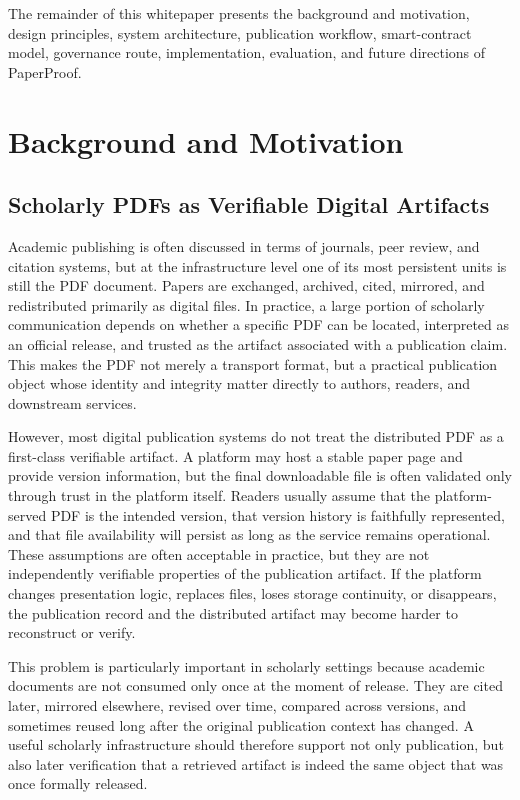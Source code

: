 \documentclass[journal]{IEEEtran}
\begin{document}
The remainder of this whitepaper presents the background and motivation, design principles, system architecture, publication workflow, smart-contract model, governance route, implementation, evaluation, and future directions of PaperProof.


\section{Background and Motivation}

\subsection{Scholarly PDFs as Verifiable Digital Artifacts}

Academic publishing is often discussed in terms of journals, peer review, and citation systems, but at the infrastructure level one of its most persistent units is still the PDF document. Papers are exchanged, archived, cited, mirrored, and redistributed primarily as digital files. In practice, a large portion of scholarly communication depends on whether a specific PDF can be located, interpreted as an official release, and trusted as the artifact associated with a publication claim. This makes the PDF not merely a transport format, but a practical publication object whose identity and integrity matter directly to authors, readers, and downstream services.

However, most digital publication systems do not treat the distributed PDF as a first-class verifiable artifact. A platform may host a stable paper page and provide version information, but the final downloadable file is often validated only through trust in the platform itself. Readers usually assume that the platform-served PDF is the intended version, that version history is faithfully represented, and that file availability will persist as long as the service remains operational. These assumptions are often acceptable in practice, but they are not independently verifiable properties of the publication artifact. If the platform changes presentation logic, replaces files, loses storage continuity, or disappears, the publication record and the distributed artifact may become harder to reconstruct or verify.

This problem is particularly important in scholarly settings because academic documents are not consumed only once at the moment of release. They are cited later, mirrored elsewhere, revised over time, compared across versions, and sometimes reused long after the original publication context has changed. A useful scholarly infrastructure should therefore support not only publication, but also later verification that a retrieved artifact is indeed the same object that was once formally released.
\end{document}
